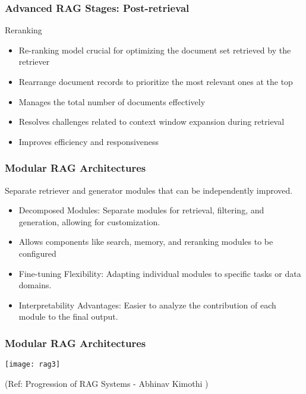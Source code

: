 \begin{frame}[fragile]\frametitle{Advanced RAG Stages: Post-retrieval}
Reranking
  \begin{itemize}
    \item Re-ranking model crucial for optimizing the document set retrieved by the retriever
    \item Rearrange document records to prioritize the most relevant ones at the top
    \item Manages the total number of documents effectively
    \item Resolves challenges related to context window expansion during retrieval
    \item Improves efficiency and responsiveness
  \end{itemize}
\end{frame}


\begin{frame}[fragile]\frametitle{Modular RAG Architectures}

Separate retriever and generator modules that can be independently improved.

\begin{itemize}
\item Decomposed Modules: Separate modules for retrieval, filtering, and generation, allowing for customization.
\item Allows components like search, memory, and reranking modules to be configured
\item Fine-tuning Flexibility: Adapting individual modules to specific tasks or data domains.
\item Interpretability Advantages: Easier to analyze the contribution of each module to the final output.
\end{itemize}	

\end{frame}



\begin{frame}[fragile]\frametitle{Modular RAG Architectures}

\begin{center}
\texttt{[image: rag3]}

{\tiny (Ref: Progression of RAG Systems - Abhinav Kimothi )}
\end{center}

\end{frame}

